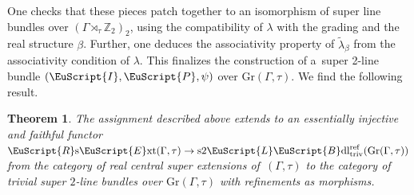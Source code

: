 \documentclass[10pt,a4paper]{amsart}
\numberwithin{equation}{section}
\newtheorem{Theorem}{Theorem}[section]
\def\mathscr#1{\EuScript{#1}}
\def\Z {\mathbb{Z}}
\newcommand{\LineBdl}{\mathscr{L}\mathscr{B}\mathrm{dl}}
\newcommand{\stwoLineBdltriv}{\mathrm{s}2\LineBdl_{\mathrm{triv}}}
\def\RsExt{\normalfont\mathscr{R}\text{s}\mathscr{E}\text{xt}}
\def\Gr{\mathrm{Gr}}
\begin{document}
One checks that these pieces patch together to an isomorphism of super line bundles over ${(\Gamma \rtimes_{\tau} \Z_2)_2}$, using the compatibility of $\lambda$ with the grading and the real structure $\beta$.
Further, one deduces the associativity property of $\tilde{\lambda}_{\beta}$ from the associativity condition of $\lambda$. This finalizes the construction of a~super 2-line bundle $(\mathscr{I},\mathscr{P},\psi)$ over $\Gr(\Gamma,\tau)$. We find the following result.
\begin{Theorem}
\label{Lemma: Real central extensions are super 2-line bundles}
\label{Proposition: Moutou real extensions embed into trivial super 2-line bundles}
 The assignment described above extends to an essentially injective and faithful functor
$
 \RsExt(\Gamma,\tau) \to \stwoLineBdltriv^{\mathrm{ref}}(\Gr(\Gamma,\tau))
$
 from the category of real central super extensions of~$(\Gamma,\tau)$ to the category of trivial super $2$-line bundles over
 $\Gr(\Gamma,\tau)$ with refinements as morphisms.
\end{Theorem}
\end{document}
